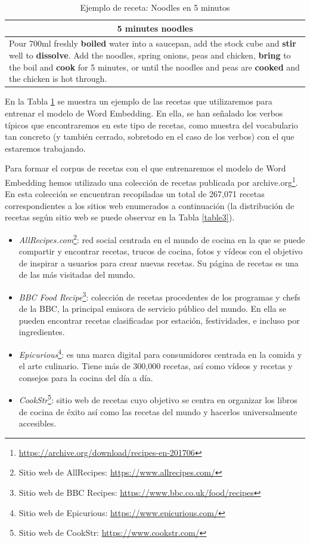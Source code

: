 \begin{table}[H]
\centering
\caption{\label{table2}Ejemplo de receta: Noodles en 5 minutos}

\begin{tabular}{m{11.5cm}}
\hline
\multicolumn{1}{c}{\textbf{5 minutes noodles}} \\ \hline \hline
Pour 700ml freshly \textbf{boiled} water into a saucepan, add the stock cube and \textbf{stir} well to \textbf{dissolve}. Add the noodles, spring onions, peas and chicken, \textbf{bring} to the boil and \textbf{cook} for 5 minutes, or until the noodles and peas are \textbf{cooked} and the chicken is hot through. \\ \hline %
\end{tabular}
\end{table}

En la Tabla \ref{table2} se muestra un ejemplo de las recetas que utilizaremos para entrenar el modelo de Word Embedding. En ella, se han señalado los verbos típicos que encontraremos en este tipo de recetas, como muestra del vocabulario tan concreto (y también cerrado, sobretodo en el caso de los verbos) con el que estaremos trabajando.
 
Para formar el corpus de recetas con el que entrenaremos el modelo de Word Embedding hemos utilizado una colección de recetas publicada por archive.org\footnote{\url{https://archive.org/download/recipes-en-201706}}. En esta colección se encuentran recopiladas un total de 267,071 recetas correspondientes a los sitios web enumerados a continuación (la distribución de recetas según sitio web se puede observar en la Tabla \ref{table3}).

\begin{itemize}
    \item \textit{AllRecipes.com}{\footnote{Sitio web de AllRecipes: \url{https://www.allrecipes.com/}}}: red social centrada en el mundo de cocina en la que se puede compartir y encontrar recetas, trucos de cocina, fotos y vídeos con el objetivo de inspirar a usuarios para crear nuevas recetas. Su página de recetas es una de las más visitadas del mundo. 
    \item \textit{BBC Food Recipe}{\footnote{Sitio web de BBC Recipes: \url{https://www.bbc.co.uk/food/recipes}}}: colección de recetas procedentes de los programas y chefs de la BBC, la principal emisora de servicio público del mundo. En ella se pueden encontrar recetas clasificadas por estación, festividades, e incluso por ingredientes. 
    \item \textit{Epicurious}{\footnote{Sitio web de Epicurious: \url{https://www.epicurious.com/}}}: es una marca digital para consumidores centrada en la comida y el arte culinario. Tiene más de 300,000 recetas, así como vídeos y recetas y consejos para la cocina del día a día.
    \item \textit{CookStr}{\footnote{Sitio web de CookStr: \url{https://www.cookstr.com/}}}: sitio web de recetas cuyo objetivo se centra en organizar los libros de cocina de éxito así como las recetas del mundo y hacerlos universalmente accesibles.
\end{itemize}

